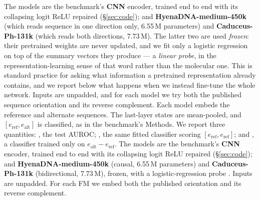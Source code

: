 The models are the benchmark's \textbf{CNN} encoder, trained end to end with its
collapsing logit ReLU repaired (\S\ref{sec:code}); and
\textbf{HyenaDNA-medium-450k} \citep{nguyen2023hyenadna} (which reads sequence in
one direction only, 6.55\,M parameters) and \textbf{Caduceus-Ph-131k}
\citep{schiff2024caduceus} (which reads both directions, 7.73\,M). The latter two
are used \emph{frozen}: their pretrained weights are never updated, and we fit
only a logistic regression on top of the summary vectors they produce
\citep{pedregosa2011sklearn} --- a \emph{linear probe}, in the
representation-learning sense of that word rather than the molecular one. This is
standard practice for asking what
information a pretrained representation already contains, and we report below
what happens when we instead fine-tune the whole network. Inputs are
unpadded, and for each model we try both the published sequence orientation and
its reverse complement.
\else
Each model embeds the reference and alternate sequences.
The last-layer states are mean-pooled, and $[e_{\mathrm{ref}}, e_{\mathrm{alt}}]$
is classified, as in the benchmark's Methods. We report three quantities:
, the test AUROC; , the same fitted classifier scoring
$[e_{\mathrm{ref}}, e_{\mathrm{ref}}]$; and \diffonly{}, a classifier trained
only on $e_{\mathrm{alt}} - e_{\mathrm{ref}}$. The models are the benchmark's
\textbf{CNN} encoder, trained end to end with its collapsing logit ReLU repaired
(\S\ref{sec:code}); and \textbf{HyenaDNA-medium-450k} \citep{nguyen2023hyenadna}
(causal, 6.55\,M parameters) and \textbf{Caduceus-Ph-131k}
\citep{schiff2024caduceus} (bidirectional, 7.73\,M), frozen, with a
logistic-regression probe \citep{pedregosa2011sklearn}. Inputs are unpadded. For
each FM we embed both the published orientation and its reverse complement.
\fi



